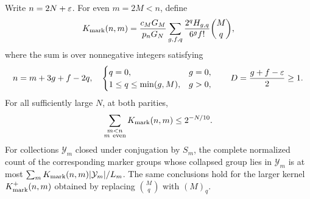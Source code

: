 \begin{theorem}
\label{thm:complete-marker-row}
Write $n=2N+\varepsilon$. For even $m=2M<n$, define
\begin{equation}\label{eq:complete-marker-kernel}
 K_{\rm mark}(n,m)=\frac{c_MG_M}{p_nG_N}
 \sum_{g,f,q}\frac{2^qH_{g,q}}{6^gf!}\binom Mq,
\end{equation}
where the sum is over nonnegative integers satisfying
\[
 n=m+3g+f-2q,\quad
 \begin{cases}q=0,&g=0,\\1\leq q\leq\min(g,M),&g>0,
 \end{cases}\qquad
 D=\frac{g+f-\varepsilon}{2}\geq1.
\]
For all sufficiently large $N$, at both parities,
\begin{equation}\label{eq:complete-marker-row}
 \sum_{\substack{m<n\\m\ \mathrm{even}}}K_{\rm mark}(n,m)
                  \leq2^{-N/10}.
\end{equation}
For collections $\mathcal Y_m$ closed under conjugation by $S_m$,
the complete normalized count of the corresponding marker groups
whose collapsed group lies in $\mathcal Y_m$ is at most
$\sum_mK_{\rm mark}(n,m)|\mathcal Y_m|/L_m$.
The same conclusions hold for the larger kernel
$K_{\rm mark}^{+}(n,m)$ obtained by replacing $\binom Mq$ with $(M)_q$.
\end{theorem}
